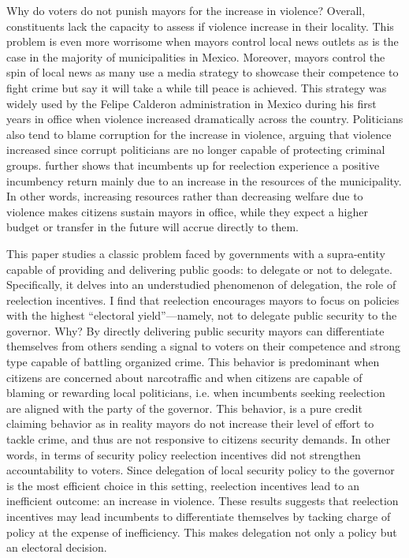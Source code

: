 \documentclass[12pt]{amsart}
\makeatletter
\def\section{\@startsection{section}{1}
	\z@{1.0\linespacing\@plus\linespacing}{.5\linespacing}{\Large}}
\numberwithin{equation}{section}
\theoremstyle{definition}
\theoremstyle{definition}
\theoremstyle{definition}
\makeatother
\begin{document}
Why do voters do not punish mayors for the increase in violence? Overall, constituents lack the capacity to assess if violence increase in their locality. This problem is even more worrisome when mayors control local news outlets as is the case in the majority of municipalities in Mexico. Moreover, mayors control the spin of local news as many use a media strategy to showcase their competence to fight crime but say it will take a while till peace is achieved. This strategy was widely used by the Felipe Calderon administration in Mexico during his first years in office when violence increased dramatically across the country. Politicians also tend to blame corruption for the increase in violence, arguing that violence increased since corrupt politicians are no longer capable of protecting criminal groups. \citet{ch_2021} further shows that incumbents up for reelection experience a positive incumbency return mainly due to an increase in the resources of the municipality. In other words, increasing resources rather than decreasing welfare due to violence makes citizens sustain mayors in office, while they expect a higher budget or transfer in the future will accrue directly to them. 

\section{Conclusion \label{sec:conclusion}}

This paper studies a classic problem faced by governments with a supra-entity capable of providing and delivering public goods: to delegate or not to delegate. Specifically, it delves into an understudied phenomenon of delegation, the role of reelection incentives. I find that reelection encourages mayors to focus on policies with the highest “electoral yield”—namely, not to delegate public security to the governor. Why? By directly delivering public security mayors can differentiate themselves from others sending a signal to voters on their competence and strong type capable of battling organized crime. This behavior is predominant when citizens are concerned about narcotraffic and when citizens are capable of blaming or rewarding local politicians, i.e. when incumbents seeking reelection are aligned with the party of the governor. This behavior, is a pure credit claiming behavior as in reality mayors do not increase their level of effort to tackle crime, and thus are not responsive to citizens security demands. In other words, in terms of security policy reelection incentives did not strengthen accountability to voters. Since delegation of local security policy to the governor is the most efficient choice in this setting, reelection incentives lead to an inefficient outcome: an increase in violence. These results suggests that reelection incentives may lead incumbents to differentiate themselves by tacking charge of policy at the expense of inefficiency. This makes delegation not only a policy but an electoral decision. 
\end{document}
